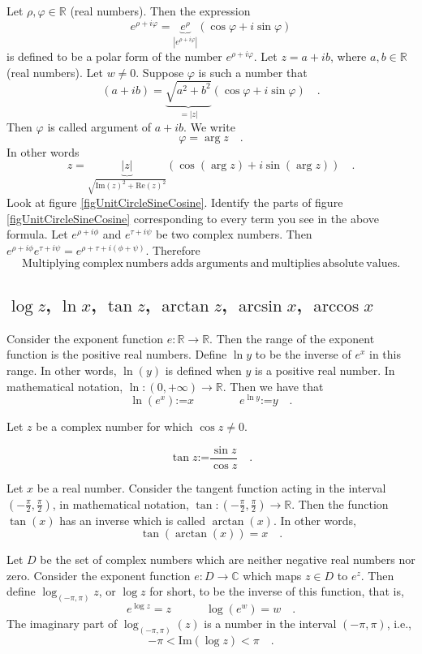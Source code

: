 \documentclass[12pt]{book}
\renewcommand{\Im}{\mathrm{Im}}
\renewcommand{\Re}{\mathrm{Re}}
\newcommand{\eqdef}{\textbf{:=}}
\newcommand{\importantFormula}[1]{\begin{equation} \boxed{#1} \end{equation}}
\begin{document}
Let $\rho, \varphi\in \mathbb R$ (real numbers). Then the expression
\[
e^{\rho+i\varphi}=\underbrace{e^{\rho}}_{|e^{\rho+i\varphi}|}(\cos \varphi + i\sin \varphi)
\]
is defined to be a polar form of the number $e^{\rho+i\varphi}$. Let $z=a+ib$, where $a, b\in \mathbb R$ (real numbers). Let $w\neq 0$. Suppose $\varphi$ is such a number that
\[
(a+ib)= \underbrace{\sqrt{a^2+b^2}}_{=|z|}(\cos \varphi + i \sin \varphi)\quad.
\]
Then $\varphi$ is called argument of $a+ib$. We write \[\varphi=\arg z\quad .\] In other words
\[z=\underbrace{|z|}_{\sqrt{\Im(z)^2+\Re(z)^2}}\left(\cos(\arg z) + i\sin (\arg z)\right)\quad .
\]
Look at figure \ref{figUnitCircleSineCosine}. Identify the parts of figure \ref{figUnitCircleSineCosine} corresponding to every term you see in the above formula.
Let $e^{\rho+i\phi}$ and $e^{\tau+i\psi}$ be two complex numbers. Then $e^{\rho+i\phi}e^{\tau+i\psi} = e^{\rho+\tau+i(\phi+\psi)}$. Therefore
\importantFormula{
\mathrm{Multiplying~complex~numbers~adds~arguments~and~multiplies~absolute~values.}
}

\subsection{$\log z$, $\ln x$, $\tan z$, $\arctan z$, $\arcsin x$, $\arccos x$}
Consider the exponent function $e: \mathbb R \to \mathbb R$. Then the range of the exponent function is the positive real numbers. Define $\ln y$ to be the inverse of $e^x$ in this range. In other words, $\ln(y)$ is defined when $y$ is a positive real number. In mathematical notation, $\ln: (0,+\infty)\to \mathbb R$. Then we have that
\importantFormula{
\ln (e^x)\eqdef x\quad\quad \quad \quad  e^{\ln y}\eqdef y\quad .
}

Let $z$ be a complex number for which $\cos z\neq 0$.

\importantFormula{
\tan z\eqdef \frac{\sin z}{\cos z}\quad .
}

Let $x$ be a real number. Consider the tangent function acting in the interval $(-\frac{\pi}{2}, \frac{\pi}{2})$, in mathematical notation, $\tan :(-\frac{\pi}{2}, \frac{\pi}{2})\to \mathbb R$. Then the function $\tan(x)$ has an inverse which is called $\arctan(x)$. In other words,
\[
\tan (\arctan(x))= x\quad .
\]

Let $D$ be the set of complex numbers which are neither negative real numbers nor zero. Consider the exponent function $e: D\to \mathbb C$ which maps $z\in D$ to $e^z$. Then define $\log_{(-\pi,\pi)} z$, or $\log z$ for short, to be the inverse of this function, that is,
\importantFormula{
e^{\log z} = z\quad \quad \quad \log (e^w)=w\quad .
}
The imaginary part of $\log_{(-\pi,\pi)}(z)$ is a number in the interval $(-\pi,\pi)$, i.e.,
\[
-\pi<\Im(\log z)<\pi\quad .
\]
\end{document}
